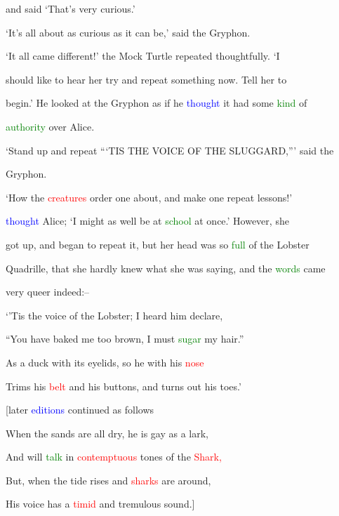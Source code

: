  and said ‘That’s very curious.’



 ‘It’s all about as curious as it can be,’ said the Gryphon.



 ‘It all came different!’ the Mock Turtle repeated thoughtfully. ‘I

 should like to hear her try and repeat something now. Tell her to

 begin.’ He looked at the Gryphon as if he \textcolor{blue}{thought} it had some \textcolor{green}{kind} of

 \textcolor{green}{authority} over Alice.



 ‘Stand up and repeat “‘TIS THE VOICE OF THE SLUGGARD,”’ said the

 Gryphon.



 ‘How the \textcolor{red}{creatures} order one about, and make one repeat \textcolor{BurntOrange}{lessons!’}

 \textcolor{blue}{thought} Alice; ‘I might as well be at \textcolor{green}{school} at once.’ However, she

 got up, and began to repeat it, but her head was so \textcolor{green}{full} of the Lobster

 Quadrille, that she hardly knew what she was saying, and the \textcolor{green}{words} came

 very queer indeed:--



 ‘’Tis the voice of the Lobster; I heard him declare,

 “You have baked me too brown, I must \textcolor{green}{sugar} my hair.”

 As a duck with its eyelids, so he with his \textcolor{red}{nose}

 Trims his \textcolor{red}{belt} and his buttons, and turns out his toes.’



 [later \textcolor{blue}{editions} continued as follows

 When the sands are all dry, he is gay as a lark,

 And will \textcolor{green}{talk} in \textcolor{red}{contemptuous} tones of the \textcolor{red}{Shark,}

 But, when the tide rises and \textcolor{red}{sharks} are around,

 His voice has a \textcolor{red}{timid} and tremulous sound.]



